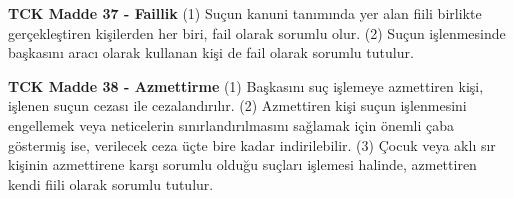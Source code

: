\documentclass[a4paper, 11pt, twocolumn]{article}
\newenvironment{lawbox}{%
    \par\noindent
    \begin{tcolorbox}[
        colback=lawbg,
        colframe=boxcolor,
        fonttitle=\bfseries,
        boxrule=0.5pt,
        left=3pt,
        right=3pt,
        top=3pt,
        bottom=3pt,
        width=\columnwidth,
        arc=2pt,
        before skip=0.2cm,
        after skip=0.2cm
    ]
    \footnotesize\itshape
}{\end{tcolorbox}}
\begin{document}
\begin{lawbox}
\textbf{TCK Madde 37 - Faillik}
\newline
(1) Suçun kanuni tanımında yer alan fiili birlikte gerçekleştiren kişilerden her biri, fail olarak sorumlu olur.
\newline
(2) Suçun işlenmesinde başkasını aracı olarak kullanan kişi de fail olarak sorumlu tutulur.
\end{lawbox}
\begin{lawbox}
\textbf{TCK Madde 38 - Azmettirme}
\newline
(1) Başkasını suç işlemeye azmettiren kişi, işlenen suçun cezası ile cezalandırılır.
\newline
(2) Azmettiren kişi suçun işlenmesini engellemek veya neticelerin sınırlandırılmasını sağlamak için önemli çaba göstermiş ise, verilecek ceza üçte bire kadar indirilebilir.
\newline
(3) Çocuk veya aklı sır kişinin azmettirene karşı sorumlu olduğu suçları işlemesi halinde, azmettiren kendi fiili olarak sorumlu tutulur.
\end{lawbox}
\end{document}
